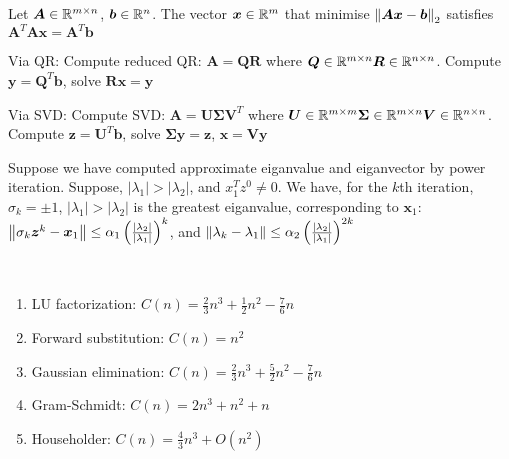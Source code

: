 \documentclass[12pt]{article}
\begin{document}
\begin{theorem}
	Let $\bm{A} \in \mathbb{R}^{m \times n}$, $\bm{b} \in \mathbb{R}^{n}$. The vector $\bm{x} \in \mathbb{R}^{m}$ that minimise $\left\lVert\bm{Ax} - \bm{b}\right\rVert_2$ satisfies $\bm{A}^T\bm{Ax} = \bm{A}^T\bm{b}$

	Via QR:
	Compute reduced QR: $\bm{A} = \bm{Q} \bm{R}$ where $\bm{Q} \in \mathbb{R}^{m \times n} \bm{R} \in \mathbb{R}^{n \times n}$. Compute $\bm{y} = \bm{Q}^T\bm{b}$, solve $\bm{Rx} = \bm{y}$

	Via SVD:
	Compute SVD: $\bm{A} = \bm{U} \bm{\Sigma} \bm{V}^T$ where $\bm{U} \in \mathbb{R}^{m \times m} \bm{\Sigma} \in \mathbb{R}^{m \times n} \bm{V} \in \mathbb{R}^{n \times n}$. Compute $\bm{z} = \bm{U}^T\bm{b}$, solve $\bm{\Sigma}\bm{y} = \bm{z}$, $\bm{x} = \bm{V}\bm{y}$


\end{theorem}

\begin{theorem}
	Suppose we have computed approximate eiganvalue and eiganvector by power iteration. 
	Suppose, $|\lambda_1| > |\lambda_2|$, and $x_1^Tz^0 \neq 0$.
	We have, for the $k$th iteration, $\sigma_k = \pm 1$, $|\lambda_1| > |\lambda_2|$ is the greatest eiganvalue, corresponding to $\bm{x}_1$:
	$\left\lVert\sigma_k \bm{z}^k - \bm{x}_1\right\rVert \leq \alpha_1 \left( \frac{|\lambda_2|}{|\lambda_1|}\right)^k$, and
	$\left\lVert\lambda_k - \lambda_1\right\rVert \leq \alpha_2 \left( \frac{|\lambda_2|}{|\lambda_1|}\right)^{2k}$
\end{theorem}

\begin{theorem}
	\ 
\begin{enumerate}
	\item LU factorization: $ C(n) = \frac{2}{3}n^3 + \frac{1}{2}n^2 - \frac{7}{6}n$ 
	\item Forward substitution: $C(n) = n^2$
	\item Gaussian elimination: $C(n) = \frac{2}{3}n^3 + \frac{5}{2}n^2 - \frac{7}{6}n$
	\item Gram-Schmidt: $C(n) = 2n^3 + n^2 + n$
	\item Householder: $C(n) = \frac{4}{3}n^3 + O(n^2)$
\end{enumerate}
\end{theorem}
\end{document}
